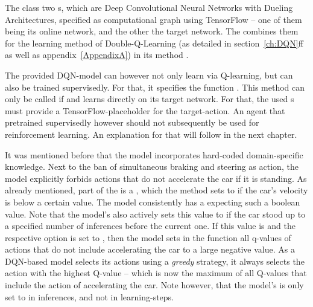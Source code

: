 The class   two s, which are Deep Convolutional Neural Networks with Dueling Architectures, specified as computational graph using TensorFlow -- one of them being its online network, and the other the target network. The  combines them for the learning method of Double-Q-Learning (as detailed in section~\ref{ch:DQN}ff as well as appendix~\ref{AppendixA}) in its method . 

The provided DQN-model can however not only learn via Q-learning, but can also be trained supervisedly. For that, it specifies the function . This method can only be called if  and learns directly on its target network. For that, the used s must provide a TensorFlow-placeholder for the target-action. An agent that pretrained supervisedly however should not subsequently be used for reinforcement learning. An explanation for that will follow in the next chapter.

It was mentioned before that the model incorporates hard-coded domain-specific knowledge. Next to the ban of simultaneous braking and steering as action, the model explicitly forbids actions that do not accelerate the car if it is standing. As already mentioned, part of the  is a , which the method  sets to  if the car's velocity is below a certain value. The model consistently has a  expecting such a boolean value. Note that the model's  also actively sets this value to  if the car stood up to a specified number of inferences before the current one. If this value is  and the respective option  is set to , then the model sets in the function  all q-values of actions that do not include accelerating the car to a large negative value. As a DQN-based model selects its actions using a \textit{greedy} strategy, it always selects the action with the highest Q-value -- which is now the maximum of all Q-values that include the action of accelerating the car. Note however, that the model's  is only set to  in inferences, and not in learning-steps.

